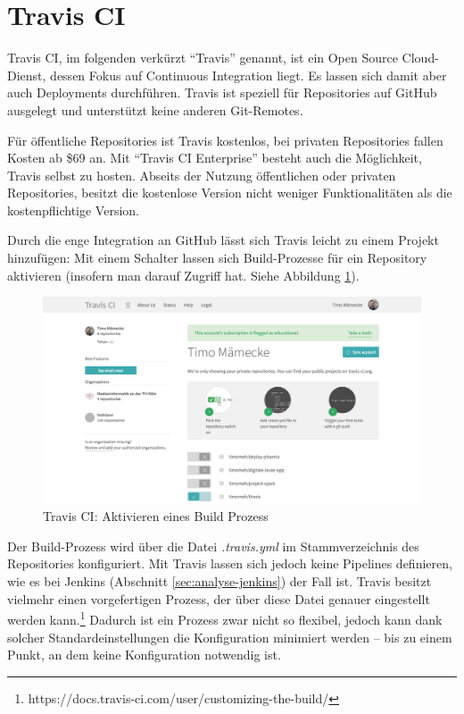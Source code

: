 \section{Travis CI}
\label{sec:analyse-travis}

Travis CI, im folgenden verkürzt ``Travis'' genannt, ist ein Open Source Cloud-Dienst, dessen Fokus auf Continuous Integration liegt. Es lassen sich damit aber auch Deployments durchführen. Travis ist speziell für Repositories auf GitHub ausgelegt und unterstützt keine anderen Git-Remotes.

Für öffentliche Repositories ist Travis kostenlos, bei privaten Repositories fallen Kosten ab \$69 an. Mit ``Travis CI Enterprise'' besteht auch die Möglichkeit, Travis selbst zu hosten. Abseits der Nutzung öffentlichen oder privaten Repositories, besitzt die kostenlose Version nicht weniger Funktionalitäten als die kostenpflichtige Version.

Durch die enge Integration an GitHub lässt sich Travis leicht zu einem Projekt hinzufügen: Mit einem Schalter lassen sich Build-Prozesse für ein Repository aktivieren (insofern man darauf Zugriff hat. Siehe Abbildung \ref{fig:travis-activate}).

\begin{figure}[h]
  \caption{Travis CI: Aktivieren eines Build Prozess}
  \label{fig:travis-activate}
  \includegraphics[width=.8\textwidth]{assets/travis-activate}
\end{figure}

Der Build-Prozess wird über die Datei \emph{.travis.yml} im Stammverzeichnis des Repositories konfiguriert. Mit Travis lassen sich jedoch keine Pipelines definieren, wie es bei Jenkins (Abschnitt \ref{sec:analyse-jenkins}) der Fall ist. Travis besitzt vielmehr einen vorgefertigen Prozess, der über diese Datei genauer eingestellt werden kann.\footnote{https://docs.travis-ci.com/user/customizing-the-build/} Dadurch ist ein Prozess zwar nicht so flexibel, jedoch kann dank solcher Standardeinstellungen die Konfiguration minimiert werden – bis zu einem Punkt, an dem keine Konfiguration notwendig ist.

